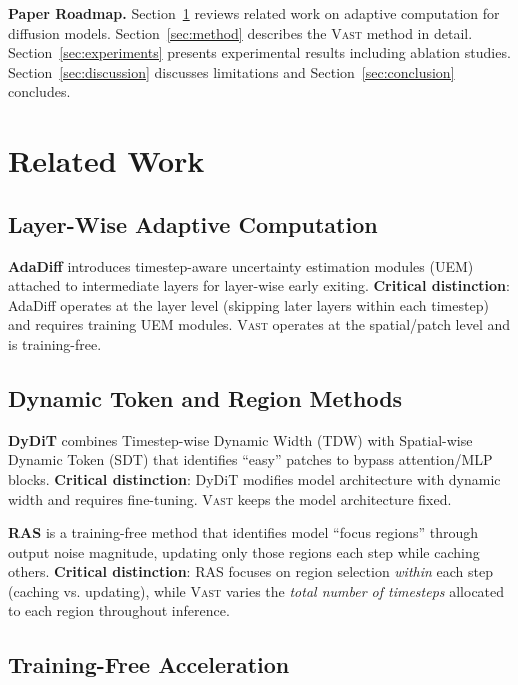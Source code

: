 \documentclass{article}
\newcommand{\vast}{\textsc{Vast}}
\begin{document}
\textbf{Paper Roadmap.} Section~\ref{sec:related} reviews related work on adaptive computation for diffusion models. Section~\ref{sec:method} describes the \vast{} method in detail. Section~\ref{sec:experiments} presents experimental results including ablation studies. Section~\ref{sec:discussion} discusses limitations and Section~\ref{sec:conclusion} concludes.

\section{Related Work}
\label{sec:related}

\subsection{Layer-Wise Adaptive Computation}

\textbf{AdaDiff} \citep{tang2024adadiff} introduces timestep-aware uncertainty estimation modules (UEM) attached to intermediate layers for layer-wise early exiting. \textbf{Critical distinction}: AdaDiff operates at the layer level (skipping later layers within each timestep) and requires training UEM modules. \vast{} operates at the spatial/patch level and is training-free.

\subsection{Dynamic Token and Region Methods}

\textbf{DyDiT} \citep{zhao2025dydit} combines Timestep-wise Dynamic Width (TDW) with Spatial-wise Dynamic Token (SDT) that identifies ``easy'' patches to bypass attention/MLP blocks. \textbf{Critical distinction}: DyDiT modifies model architecture with dynamic width and requires fine-tuning. \vast{} keeps the model architecture fixed.

\textbf{RAS} \citep{liu2025ras} is a training-free method that identifies model ``focus regions'' through output noise magnitude, updating only those regions each step while caching others. \textbf{Critical distinction}: RAS focuses on region selection \textit{within} each step (caching vs. updating), while \vast{} varies the \textit{total number of timesteps} allocated to each region throughout inference.

\subsection{Training-Free Acceleration}
\end{document}
